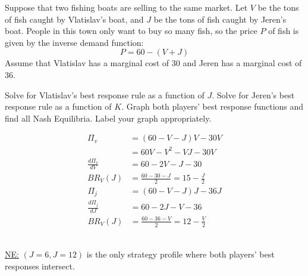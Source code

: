 \documentclass{article}
\begin{document}
\begin{question}
Suppose that two fishing boats are selling to the same market.
Let $V$ be the tons of fish caught by Vlatislav's boat,
and $J$ be the tons of fish caught by Jeren's boat.
People in this town only want to buy so many fish,
so the price $P$ of fish is given by the inverse demand function:
  $$P = 60 - (V+J)$$
Assume that Vlatislav has a marginal cost of 30
and Jeren has a marginal cost of 36.
\begin{tasks}
  \task Solve for Vlatislav's best response rule
  as a function of $J$.
  \task Solve for Jeren's best response rule
  as a function of $K$.
  \task
  Graph both players' best response functions 
  and find all Nash Equilibria.
  Label your graph appropriately.
\end{tasks}
\begin{solution}
  \begin{tasks}
    \task
    \begin{align*}
      \Pi_v & = (60 - V - J)V - 30 V \\
            & = 60V - V^2 - VJ - 30 V \\
      \frac{d\Pi_v}{dV} & = 60 - 2V - J - 30 \\
      BR_V(J) & = \frac{60-30-J}{2} = 15 - \frac{J}{2}
    \end{align*}
  \task
  \begin{align*}
      \Pi_j & = (60 - V - J)J - 36 J \\
      \frac{d\Pi_j}{dJ} & = 60 - 2J - V - 36 \\
      BR_V(J) & = \frac{60-36-V}{2} = 12 - \frac{V}{2}
  \end{align*}
  \task
{} \\
\underline{NE:} $(J=6, J=12)$ is the only strategy profile
where both players' best responses intersect.
  \end{tasks}
\end{solution}
\end{question}
\end{document}

